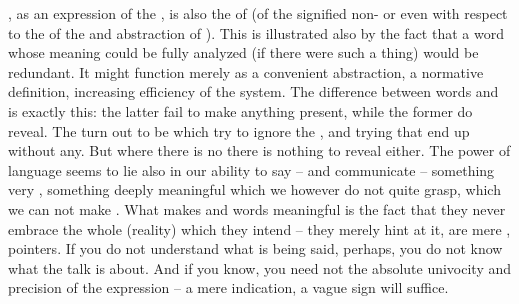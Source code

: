 , as an expression of the , is also the  of
 (of the signified non- or even 
with respect to the 
 of the  and abstraction of ). This is
illustrated also by the fact that a word whose meaning could be fully analyzed
(if there were such a thing) would be redundant. It might function merely as a
convenient abstraction, a normative definition, increasing efficiency of the
system.  The difference between {words} and  is exactly this:
the latter fail to make anything present, while the former do reveal.  The
 turn out to be  which try to ignore the
, and trying that end up without any. But where there is no
 there is nothing to reveal either.  The power of language seems to
lie also in our ability to say -- and communicate -- something very
, something deeply meaningful which we however do not quite grasp,
which we can not make .  What makes  and words meaningful
is the fact that they never embrace the whole (reality) which they intend --
they merely hint at it, are mere , pointers. If you do not understand
what is being said, perhaps, you do not know what the talk is about. And if you
know, you need not the absolute univocity and precision of the expression -- a
mere indication, a vague sign will suffice.


